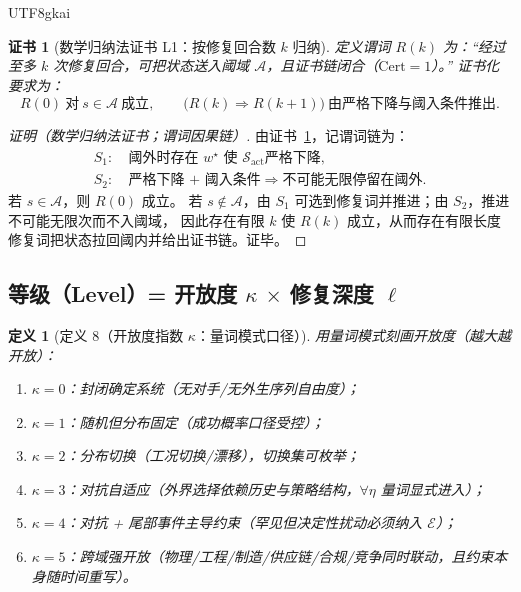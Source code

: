 \documentclass[12pt]{article}
\newtheorem{definition}{定义}[section]
\newtheorem{Certificate}{证书}[section]
\newcommand{\Cert}{\ensuremath{\mathrm{Cert}}}
\begin{document}
\begin{CJK*}{UTF8}{gkai}
\begin{Certificate}[数学归纳法证书 L1：按修复回合数 $k$ 归纳]
\label{cert:tex25-lem1-induction}
定义谓词 $R(k)$ 为：“经过至多 $k$ 次修复回合，可把状态送入阈域 $\mathcal{A}$，且证书链闭合（$\Cert=1$）。”
证书化要求为：
\[
  R(0)\ \text{对}\ s\in\mathcal{A}\ \text{成立},\qquad
  \bigl(R(k)\Rightarrow R(k+1)\bigr)\ \text{由严格下降与阈入条件推出}.
\]
\end{Certificate}

\begin{proof}[证明（数学归纳法证书；谓词因果链）]
由证书~\ref{cert:tex25-lem1-induction}，记谓词链为：
\[
  \begin{aligned}
    S_1:&\ \text{阈外时存在 }w^\star\text{ 使 }\mathcal{S}_{\mathrm{act}}\text{严格下降},\\
    S_2:&\ \text{严格下降 + 阈入条件}\Rightarrow\text{不可能无限停留在阈外}.
  \end{aligned}
\]
若 $s\in\mathcal{A}$，则 $R(0)$ 成立。
若 $s\notin\mathcal{A}$，由 $S_1$ 可选到修复词并推进；由 $S_2$，推进不可能无限次而不入阈域，
因此存在有限 $k$ 使 $R(k)$ 成立，从而存在有限长度修复词把状态拉回阈内并给出证书链。证毕。
\end{proof}

\subsection{等级（Level）= 开放度 $\kappa$ $\times$ 修复深度 $\ell$}
\label{subsec:tex25-level}

\begin{definition}[定义 8（开放度指数 $\kappa$：量词模式口径）]
用量词模式刻画开放度（越大越开放）：
\begin{enumerate}
  \item $\kappa=0$：封闭确定系统（无对手/无外生序列自由度）；
  \item $\kappa=1$：随机但分布固定（成功概率口径受控）；
  \item $\kappa=2$：分布切换（工况切换/漂移），切换集可枚举；
  \item $\kappa=3$：对抗自适应（外界选择依赖历史与策略结构，$\forall \eta$ 量词显式进入）；
  \item $\kappa=4$：对抗 + 尾部事件主导约束（罕见但决定性扰动必须纳入 $\mathcal{E}$）；
  \item $\kappa=5$：跨域强开放（物理/工程/制造/供应链/合规/竞争同时联动，且约束本身随时间重写）。
\end{enumerate}
\end{definition}


\end{CJK*}
\end{document}
